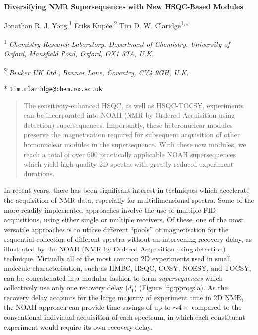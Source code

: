 \documentclass[11pt]{article}
\newcommand*{\proton}{\ce{^{1}H}}
\newcommand*{\figref}[1]{Figure \ref{fig:#1}}
\begin{document}
\begin{center}
    \Large \textbf{Diversifying NMR Supersequences with New HSQC-Based Modules}

    \vspace{0.2cm}

    \large Jonathan R. J. Yong,\textsuperscript{1} {\=E}riks Kup{\v{c}}e,\textsuperscript{2} Tim D. W. Claridge\textsuperscript{1,}*

    \vspace{0.2cm}

    \normalsize

    \textsuperscript{1} \textit{Chemistry Research Laboratory, Department of Chemistry, University of Oxford, Mansfield Road, Oxford, OX1 3TA, U.K.}

    \textsuperscript{2} \textit{Bruker UK Ltd., Banner Lane, Coventry, CV4 9GH, U.K.}

    * \texttt{tim.claridge@chem.ox.ac.uk}
\end{center}
\vspace{0.5cm}
\begin{abstract}
    The sensitivity-enhanced HSQC, as well as HSQC-TOCSY, experiments can be incorporated into NOAH (NMR by Ordered Acquisition using \proton{} detection) supersequences.
    Importantly, these heteronuclear modules preserve the magnetisation required for subsequent acquisition of other homonuclear modules in the supersequence.
    With these new modules, we reach a total of over 600 practically applicable NOAH supersequences which yield high-quality 2D spectra with greatly reduced experiment durations.
\end{abstract}


In recent years, there has been significant interest in techniques which accelerate the acquisition of NMR data, especially for multidimensional spectra.\autocite{ultrafast, timeshared, multireceive}
Some of the more readily implemented approaches involve the use of multiple-FID acquisitions, using either single or multiple receivers.
Of these, one of the most versatile approaches is to utilise different ``pools'' of magnetisation for the sequential collection of different spectra without an intervening recovery delay, as illustrated by the NOAH (NMR by Ordered Acquisition using \proton{} detection) technique.\autocite{noah}
Virtually all of the most common 2D experiments used in small molecule characterisation, such as HMBC, HSQC, COSY, NOESY, and TOCSY, can be concatenated in a modular fashion to form \textit{supersequences} which collectively use only one recovery delay ($d_1$) (\figref{pprogs}a).
As the recovery delay accounts for the large majority of experiment time in 2D NMR, the NOAH approach can provide time savings of up to $\sim 4\times$ compared to the conventional individual acquisition of each spectrum, in which each constituent experiment would require its own recovery delay.
\end{document}
